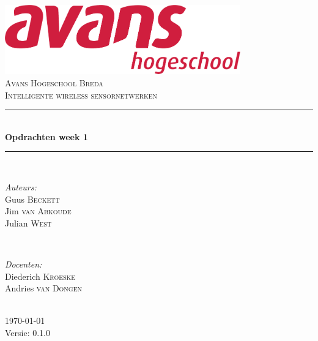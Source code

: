 \documentclass[12pt]{article}
\begin{document}
\begin{titlepage}
\newcommand{\HRule}{\rule{\linewidth}{0.5mm}} %

\center %

\includegraphics[height=3cm] {avans}\\%
\textsc{\Large Avans Hogeschool Breda}\\[0.5cm] %
\textsc{\large Intelligente wireless sensornetwerken }\\[0.5cm] %
\HRule \\[0.4cm]
{ \huge \bfseries Opdrachten week 1}\\[0.4cm] %
\HRule \\[1.5cm]

\begin{minipage}{0.4\textwidth}
\begin{flushleft} \large
\emph{Auteurs:}\\
Guus \textsc{Beckett} \\%
Jim \textsc{van Abkoude} \\
Julian \textsc{West}
\end{flushleft}
\end{minipage}
~
\begin{minipage}{0.4\textwidth}
\begin{flushright} \large
\emph{Docenten:} \\
Diederich \textsc{Kroeske} \\ %
Andries \textsc{van Dongen} \\ %
\end{flushright}
\end{minipage}\\[4cm]

{\large \today}\\[3cm] %

Versie: 0.1.0

\vfill %

\end{titlepage}
\end{document}
